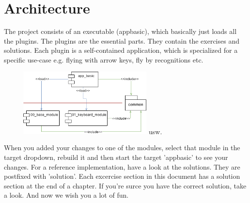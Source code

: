 \section{Architecture}
The project consists of an executable (app\textunderscore basic), which basically just loads all the plugins.
The plugins are the essential parts. They contain the exercises and solutions. Each plugin is a self-contained application,
which is specialized for a specific use-case e.g. flying with arrow keys, fly by recognitions etc.
\begin{figure}[H]
    \centering
    \includegraphics[width=0.6\textwidth]{../common/chapter_01/resources/02_architecture.png}
    usw.
\end{figure}
When you added your changes to one of the modules, select that module in the target dropdown, rebuild it and then
start the target 'app\textunderscore basic' to see your changes. For a reference implementation, have a look at the solutions.
They are postfixed with '\textunderscore solution'. Each excercise section in this document has a solution section at
the end of a chapter. If you're surce you have the correct solution, take a look.\newline
And now we wish you a lot of fun.